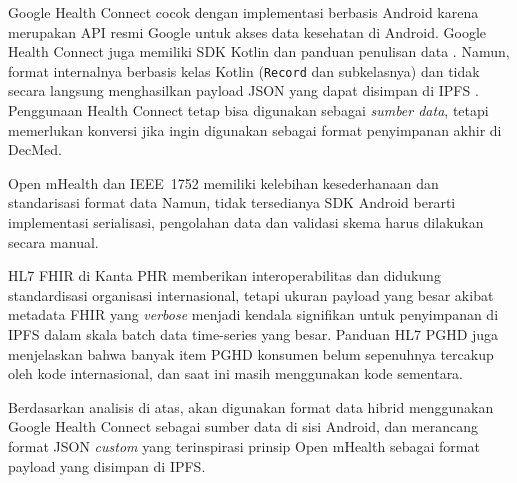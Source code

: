 Google Health Connect cocok dengan implementasi berbasis Android karena merupakan API resmi Google untuk akses data kesehatan di Android.
Google Health Connect juga memiliki SDK Kotlin dan panduan penulisan data \parencite{android_hc_write,android_hc_dataformat}.
Namun, format internalnya berbasis kelas Kotlin (\texttt{Record} dan subkelasnya) dan tidak secara langsung menghasilkan payload JSON yang dapat disimpan di IPFS \parencite{android_hc_dataformat}.
Penggunaan Health Connect tetap bisa digunakan sebagai \textit{sumber data}, tetapi memerlukan konversi jika ingin digunakan sebagai format penyimpanan akhir di DecMed.

Open mHealth dan IEEE~1752 memiliki kelebihan kesederhanaan dan standarisasi format data \parencite{openmhealth_1752_blog,ieee_1752_1_2021_standard}
Namun, tidak tersedianya SDK Android berarti implementasi serialisasi, pengolahan data dan validasi skema harus dilakukan secara manual.

HL7 FHIR di Kanta PHR memberikan interoperabilitas dan didukung standardisasi organisasi internasional, tetapi ukuran payload yang besar akibat metadata FHIR yang \textit{verbose} menjadi kendala signifikan untuk penyimpanan di IPFS dalam skala batch data time-series yang besar.
Panduan HL7 PGHD juga menjelaskan bahwa banyak item PGHD konsumen belum sepenuhnya tercakup oleh kode internasional, dan saat ini masih menggunakan kode sementara.\parencite{hl7_2025_pghd_ig}

Berdasarkan analisis di atas, akan digunakan format data hibrid menggunakan Google Health Connect sebagai sumber data di sisi Android, dan merancang format JSON \textit{custom} yang terinspirasi prinsip Open mHealth sebagai format payload yang disimpan di IPFS\@.


